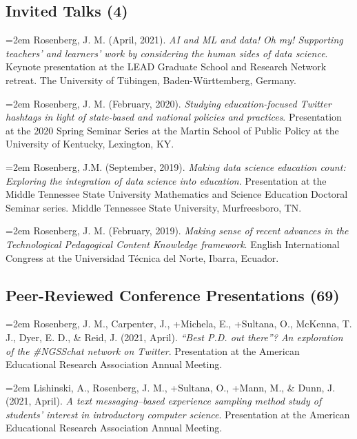 \documentclass[
  14,
]{article}
\begin{document}
\hypertarget{invited-talks-4}{%
\subsection{Invited Talks (4)}\label{invited-talks-4}}

\hangindent=2em Rosenberg, J. M. (April, 2021). \emph{AI and ML and
data! Oh my! Supporting teachers' and learners' work by considering the
human sides of data science}. Keynote presentation at the LEAD Graduate
School and Research Network retreat. The University of Tübingen,
Baden-Württemberg, Germany.

\hangindent=2em Rosenberg, J. M. (February, 2020). \emph{Studying
education-focused Twitter hashtags in light of state-based and national
policies and practices}. Presentation at the 2020 Spring Seminar Series
at the Martin School of Public Policy at the University of Kentucky,
Lexington, KY.

\hangindent=2em Rosenberg, J.M. (September, 2019). \emph{Making data
science education count: Exploring the integration of data science into
education}. Presentation at the Middle Tennessee State University
Mathematics and Science Education Doctoral Seminar series. Middle
Tennessee State University, Murfreesboro, TN.

\hangindent=2em Rosenberg, J. M. (February, 2019). \emph{Making sense of
recent advances in the Technological Pedagogical Content Knowledge
framework}. English International Congress at the Universidad Técnica
del Norte, Ibarra, Ecuador.

\hypertarget{peer-reviewed-conference-presentations-69}{%
\subsection{Peer-Reviewed Conference Presentations
(69)}\label{peer-reviewed-conference-presentations-69}}

\hangindent=2em Rosenberg, J. M., Carpenter, J., +Michela, E., +Sultana,
O., McKenna, T. J., Dyer, E. D., \& Reid, J. (2021, April). \emph{``Best
P.D. out there''? An exploration of the \#NGSSchat network on Twitter}.
Presentation at the American Educational Research Association Annual
Meeting.

\hangindent=2em Lishinski, A., Rosenberg, J. M., +Sultana, O., +Mann,
M., \& Dunn, J. (2021, April). \emph{A text messaging--based experience
sampling method study of students' interest in introductory computer
science}. Presentation at the American Educational Research Association
Annual Meeting.
\end{document}

